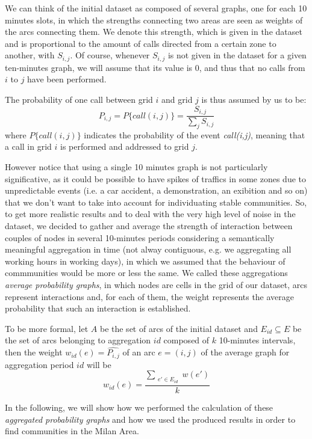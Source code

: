 We can think of the initial dataset as composed of several graphs, one for each 10 minutes slots, in which the strengths connecting two areas are seen as weights of the arcs connecting them. We denote this strength, which is given in the
dataset and is proportional to the amount of calls directed from a certain zone to another, with $S_{i,j}$. 
Of course, whenever $S_{i,j}$ is not given in the dataset for a given ten-minutes graph, we will assume that its value is 0, and thus that no calls from $i$ to $j$ have been performed.

The probability of one call between grid $i$ and grid $j$ is thus assumed by us to be: 
$$
P_{i,j} = P\{call(i,j)\} = \frac{S_{i,j}}{\sum_{j}{}{S_{i,j}}}
$$
where $P\{call(i,j)\}$ indicates the probability of the event \emph{call(i,j)}, meaning that a call in grid $i$ is performed and addressed to grid $j$.

However notice that using a single 10 minutes graph is not particularly significative, as it could be possible to have spikes of traffics in some zones due to unpredictable events (i.e. a car accident, a demonstration, an exibition and so on) that we don't want to take into account for individuating stable communities.
So, to get more realistic results and to deal with the very high level of noise in the dataset,
we decided to gather and average the strength of interaction between couples of nodes in several 10-minutes periods
considering a semantically meaningful aggregation in time (not alway contiguous, e.g. we aggregating all working hours in working days), in which we assumed that the behaviour of commmunities would be more or less the same.
\label{AVGPG}
We called these aggregations \emph{average probability graphs}, in which nodes are cells in the grid of our dataset, arcs represent interactions and, for each of them, the weight represents the average probability that such an interaction is established.

To be more formal, let $A$ be the set of arcs of the initial dataset and $E_{id} \subseteq E$ be the set of arcs belonging to aggregation $id$ composed of $k$ 10-minutes intervals, then the weight $w_{id}(e)=\widehat{P_{i,j}}$ of an arc $e=(i,j)$ of the average graph for aggregation period $id$ will be 
$$
w_{id}(e) = \frac{\sum_{\substack{e' \in E_{id}}} w(e')}{k}
$$

In the following, we will show how we performed the calculation of these \emph{aggregated probability graphs} and how we used the produced results in order to find communities in the Milan Area.